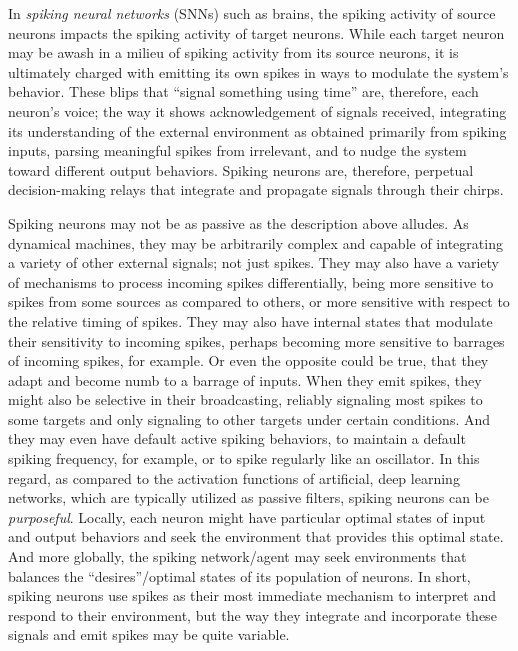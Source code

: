 In \emph{spiking neural networks} (SNNs) such as brains, the spiking activity of source neurons impacts the spiking activity of target neurons.
While each target neuron may be awash in a milieu of spiking activity from its source neurons, it is ultimately charged with emitting its own spikes in ways to modulate the system's behavior.
These blips that ``signal something using time'' are, therefore, each neuron's voice; the way it shows acknowledgement of signals received, integrating its understanding of the external environment as obtained primarily from spiking inputs, parsing meaningful spikes from irrelevant, and to nudge the system toward different output behaviors.
Spiking neurons are, therefore, perpetual decision-making relays that integrate and propagate signals through their chirps.

Spiking neurons may not be as passive as the description above alludes.
As dynamical machines, they may be arbitrarily complex and capable of integrating a variety of other external signals; not just spikes.
They may also have a variety of mechanisms to process incoming spikes differentially, being more sensitive to spikes from some sources as compared to others, or more sensitive with respect to the relative timing of spikes.
They may also have internal states that modulate their sensitivity to incoming spikes, perhaps becoming more sensitive to barrages of incoming spikes, for example.
Or even the opposite could be true, that they adapt and become numb to a barrage of inputs.
When they emit spikes, they might also be selective in their broadcasting, reliably signaling most spikes to some targets and only signaling to other targets under certain conditions.
And they may even have default active spiking behaviors, to maintain a default spiking frequency, for example, or to spike regularly like an oscillator.
In this regard, as compared to the activation functions of artificial, deep learning networks, which are typically utilized as passive filters, spiking neurons can be \emph{purposeful}.
Locally, each neuron might have particular optimal states of input and output behaviors and seek the environment that provides this optimal state.
And more globally, the spiking network/agent may seek environments that balances the ``desires''/optimal states of its population of neurons.
In short, spiking neurons use spikes as their most immediate mechanism to interpret and respond to their environment, but the way they integrate and incorporate these signals and emit spikes may be quite variable.

